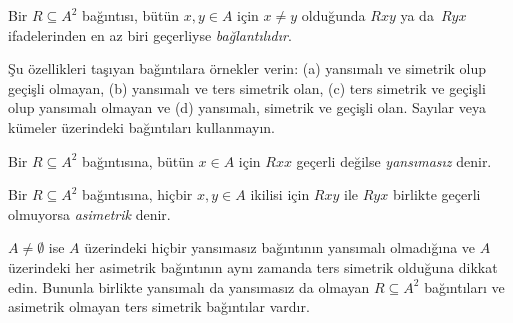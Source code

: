 \documentclass[../../../include/open-logic-section]{subfiles}
\begin{document}
\begin{defn}[Bağlantılılık]
Bir $R \subseteq A^2$ bağıntısı, bütün $x,y\in A$ için $x\neq y$ olduğunda
$Rxy$ ya da~$Ryx$ ifadelerinden en az biri geçerliyse \emph{bağlantılıdır}.
\end{defn}

\begin{prob}
Şu özellikleri taşıyan bağıntılara örnekler verin: (a) yansımalı ve simetrik
olup geçişli olmayan, (b) yansımalı ve ters simetrik olan, (c) ters simetrik ve
geçişli olup yansımalı olmayan ve (d) yansımalı, simetrik ve geçişli olan.
Sayılar veya kümeler üzerindeki bağıntıları kullanmayın.
\end{prob}

\begin{defn}[Yansımasızlık]
Bir $R \subseteq A^2$ bağıntısına, bütün $x \in A$ için $Rxx$ geçerli değilse
\emph{yansımasız} denir.
\end{defn}

\begin{defn}[Asimetriklik]
Bir $R \subseteq A^2$ bağıntısına, hiçbir $x,y\in A$ ikilisi için $Rxy$ ile
$Ryx$ birlikte geçerli olmuyorsa \emph{asimetrik} denir.
\end{defn}

$A \neq \emptyset$ ise $A$ üzerindeki hiçbir yansımasız bağıntının yansımalı
olmadığına ve $A$ üzerindeki her asimetrik bağıntının aynı zamanda ters
simetrik olduğuna dikkat edin. Bununla birlikte yansımalı da yansımasız da
olmayan $R \subseteq A^2$ bağıntıları ve asimetrik olmayan ters
simetrik bağıntılar vardır.
\end{document}
